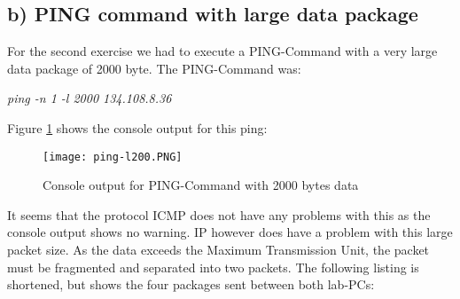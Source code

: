 \subsection{b) PING command with large data package}
For the second exercise we had to execute a PING-Command with a very large data package of 2000 byte. The PING-Command was:
\begin{center}
	\textit{ping -n 1 -l 2000 134.108.8.36}
\end{center}
Figure \ref{ping-l2000} shows the console output for this ping:
\begin{figure}[H]
	\centering
	\texttt{[image: ping-l200.PNG]}
	\caption{Console output for PING-Command with 2000 bytes data}
	\label{ping-l2000}
\end{figure}
It seems that the protocol ICMP does not have any problems with this as the console output shows no warning. IP however does have a problem with this large packet size. As the data exceeds the Maximum Transmission Unit, the packet must be fragmented and separated into two packets. The following listing is shortened, but shows the four packages sent between both lab-PCs:
\\
